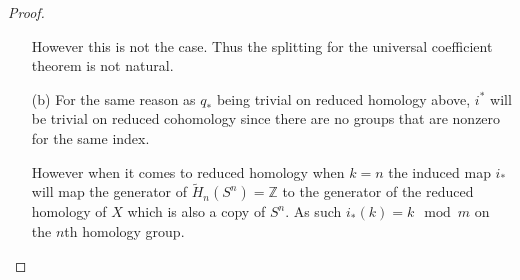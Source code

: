 \documentclass[10pt]{article}
\newcommand{\bb}[1]{\mathbb{#1}}
\newcommand{\rH}{\widetilde{H}}
\theoremstyle{remark}
\begin{document}
\begin{proof}
\begin{itemize}
    However this is not the case. Thus the splitting for the universal coefficient
    theorem is not natural.
\item[(b)] For the same reason as $q_*$ being trivial on reduced homology above, $i^*$
  will be trivial on reduced cohomology since there are no groups that are nonzero
  for the same index.

  However when it comes to reduced homology when $k=n$ the induced map $i_*$
  will map the generator of $\rH_n(S^n)=\bb{Z}$ to the generator of the reduced
  homology of $X$ which is also a copy of $S^n$. As such $i_*(k)=k\mod m$
  on the $n$th homology group.
  \end{itemize}
\end{proof}
\end{document}
